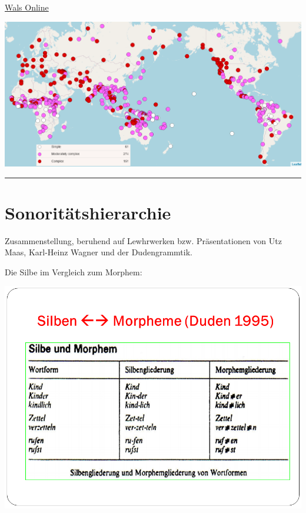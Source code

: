 \documentclass[
  letterpaper,
]{scrbook}
\begin{document}
\href{https://wals.info/}{Wals Online}

\includegraphics[width=1\textwidth,height=\textheight]{./pictures/01b_NSG_Intro_2020-10-07/wals_syllable_structure.png}

\begin{center}\rule{0.5\linewidth}{0.5pt}\end{center}

\hypertarget{sonorituxe4tshierarchie}{%
\section{Sonoritätshierarchie}\label{sonorituxe4tshierarchie}}

Zusammenstellung, beruhend auf Lewhrwerken bzw. Präsentationen von Utz
Maas, Karl-Heinz Wagner und der Dudengrammtik.

Die Silbe im Vergleich zum Morphem:

\includegraphics[width=1\textwidth,height=\textheight]{./pictures/Wagner_Maas_Duden_Petric_2.PNG}
\end{document}
